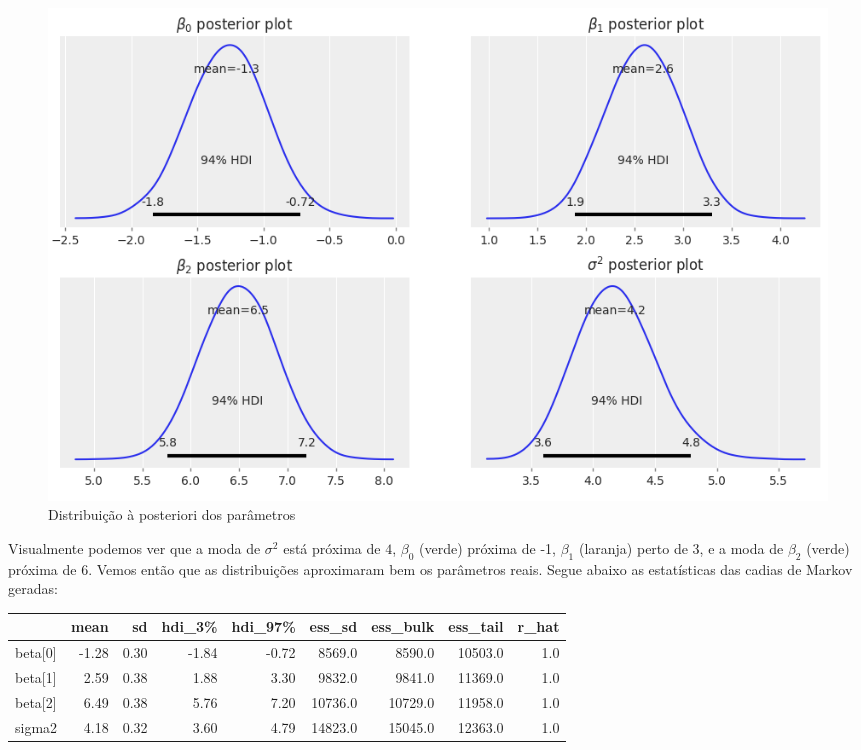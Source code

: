 \documentclass[12pt,letterpaper]{article}
\begin{document}
	\begin{figure}[!htb]
		\centering
		\includegraphics[scale=0.5]{../images/posteriori1.png}
		
		\caption{Distribuição à posteriori dos parâmetros}
		\label{post1}
	\end{figure}
	Visualmente podemos ver que a moda de $\sigma^2$ está próxima de $4$, $\beta_0$ (verde) próxima de -1, $\beta_1$ (laranja) perto de 3, e a moda de $\beta_2$ (verde) próxima de 6. Vemos então que as distribuições aproximaram bem os parâmetros reais. Segue abaixo as estatísticas das cadias de Markov geradas:
	
\begin{tabular}{lrrrrrrrr}
	\toprule
	{} &  mean &    sd &  hdi\_3\% &  hdi\_97\% &   ess\_sd &  ess\_bulk &  ess\_tail &  r\_hat \\
	\midrule
	beta[0] & -1.28 &  0.30 &   -1.84 &    -0.72 &   8569.0 &    8590.0 &   10503.0 &    1.0 \\
	beta[1] &  2.59 &  0.38 &    1.88 &     3.30 &   9832.0 &    9841.0 &   11369.0 &    1.0 \\
	beta[2] &  6.49 &  0.38 &    5.76 &     7.20 &  10736.0 &   10729.0 &   11958.0 &    1.0 \\
	sigma2  &  4.18 &  0.32 &    3.60 &     4.79 &  14823.0 &   15045.0 &   12363.0 &    1.0 \\
	\bottomrule
\end{tabular}
	
\end{document}
